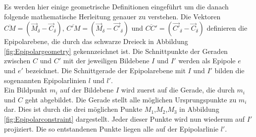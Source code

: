 
Es werden hier einige geometrische Definitionen eingeführt um die danach folgende mathematische Herleitung genauer zu verstehen. Die Vektoren $\overline{CM} = (\overrightarrow{M}_\delta - \overrightarrow{C}_\delta),\, \overline{C'M} = (\overrightarrow{M}_\delta - \overrightarrow{C'}_\delta)$ und $\overline{CC'} = (\overrightarrow{C'}_\delta - \overrightarrow{C}_\delta)$ definieren die Epipolarebene, die durch das schwarze Dreieck in Abbildung \ref{fig:Epipolargeometry} gekennzeichnet ist. Die Schnittpunkte der Geraden zwischen $C$ und $C'$ mit der jeweiligen Bildebene $I$ und $I'$ werden als Epipole $e$ und $e'$ bezeichnet. Die Schnittgerade der Epipolarebene mit $I$ und $I'$ bilden die sogenannten Epipolarlinien $l$ und $l'$\cite{HZ,Zhang2014,ZZPaper,phdTwoView,Elements}.\\%

Ein Bildpunkt $m_i$ auf der Bildebene $I$ wird zuerst auf die Gerade, die durch $m_i$ und $C$ geht abgebildet. Die Gerade stellt alle möglichen Ursprungspunkte zu $m_i$ dar. Dies ist durch die drei möglichen Punkte $M_1$,$M_2$,$M_3$ in Abbildung \ref{fig:Epipolarconstraint} dargestellt. Jeder dieser Punkte wird nun wiederum auf $I'$ projiziert. Die so entstandenen Punkte liegen alle auf der Epipolarlinie $l'$\cite{HZ}. 


